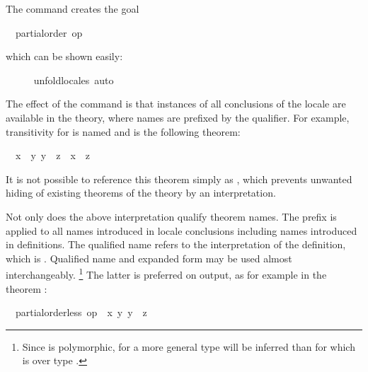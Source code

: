 \begin{isabellebody}
\begin{isamarkuptxt}

  The command creates the goal
  \begin{isabelle}%
\ {}{\isachardot}\ partial{\isacharunderscore}order\ op\ {\isasymle}%
\end{isabelle} which can be shown easily:%
\end{isamarkuptxt}%
\isamarkuptrue%
\ \ \ \ \isamarkupfalse%
\ unfold{\isacharunderscore}locales\ auto%
\endisatagvisible
{\isafoldvisible}%
%
\isadelimvisible
%
\endisadelimvisible
%
\begin{isamarkuptext}%
The effect of the command is that instances of all
  conclusions of the locale are available in the theory, where names
  are prefixed by the qualifier.  For example, transitivity for  is named  and is the following
  theorem:
  \begin{isabelle}%
\ \ {\isasymlbrakk}{\isacharquery}x\ {\isasymle}\ {\isacharquery}y{\isacharsemicolon}\ {\isacharquery}y\ {\isasymle}\ {\isacharquery}z{\isasymrbrakk}\ {\isasymLongrightarrow}\ {\isacharquery}x\ {\isasymle}\ {\isacharquery}z%
\end{isabelle}
  It is not possible to reference this theorem simply as , which prevents unwanted hiding of existing theorems of the
  theory by an interpretation.%
\end{isamarkuptext}%
\isamarkuptrue%
%
\isamarkuptrue%
%
\begin{isamarkuptext}%
Not only does the above interpretation qualify theorem names.
  The prefix  is applied to all names introduced in locale
  conclusions including names introduced in definitions.  The
  qualified name  refers to
  the interpretation of the definition, which is .
  Qualified name and expanded form may be used almost
  interchangeably.%
\footnote{Since  is polymorphic, for  a
  more general type will be inferred than for  which
  is over type .}
  The latter is preferred on output, as for example in the theorem
  : \begin{isabelle}%
\ \ {\isasymlbrakk}partial{\isacharunderscore}order{\isachardot}less\ op\ {\isasymle}\ {\isacharquery}x\ {\isacharquery}y{\isacharsemicolon}\ {\isacharquery}y\ {\isasymle}\ {\isacharquery}z{\isasymrbrakk}\isanewline

\end{isabelle}
\end{isamarkuptext}
\end{isabellebody}
